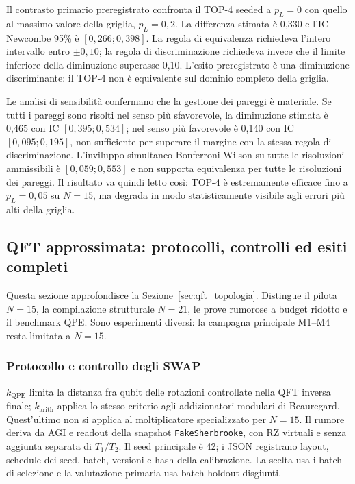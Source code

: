 \begin{onehalfspace}
\begin{table}[H]
\end{table}

Il contrasto primario preregistrato confronta il TOP-4 seeded a $p_L=0$ con quello al massimo valore della griglia, $p_L=0,2$. La differenza stimata \`e 0,330 e l'IC Newcombe 95\% \`e $[0,266;0,398]$. La regola di equivalenza richiedeva l'intero intervallo entro $\pm0,10$; la regola di discriminazione richiedeva invece che il limite inferiore della diminuzione superasse 0,10. L'esito preregistrato \`e una diminuzione discriminante: il TOP-4 non \`e equivalente sul dominio completo della griglia.

Le analisi di sensibilit\`a confermano che la gestione dei pareggi \`e materiale. Se tutti i pareggi sono risolti nel senso pi\`u sfavorevole, la diminuzione stimata \`e 0,465 con IC $[0,395;0,534]$; nel senso pi\`u favorevole \`e 0,140 con IC $[0,095;0,195]$, non sufficiente per superare il margine con la stessa regola di discriminazione. L'inviluppo simultaneo Bonferroni-Wilson su tutte le risoluzioni ammissibili \`e $[0,059;0,553]$ e non supporta equivalenza per tutte le risoluzioni dei pareggi. Il risultato va quindi letto cos\`i: TOP-4 \`e estremamente efficace fino a $p_L=0,05$ su $N=15$, ma degrada in modo statisticamente visibile agli errori pi\`u alti della griglia.

\subsection{QFT approssimata: protocolli, controlli ed esiti completi}
\label{sec:app_aqft}

Questa sezione approfondisce la Sezione~\ref{sec:qft_topologia}.
Distingue il pilota $N=15$, la compilazione strutturale $N=21$, le prove
rumorose a budget ridotto e il benchmark QPE. Sono esperimenti diversi:
la campagna principale M1--M4 resta limitata a $N=15$.

\subsubsection{Protocollo e controllo degli SWAP}

$k_{\mathrm{QPE}}$ limita la distanza fra qubit delle rotazioni
controllate nella QFT inversa finale; $k_{\mathrm{arith}}$ applica lo
stesso criterio agli addizionatori modulari di Beauregard.
Quest'ultimo non si applica al moltiplicatore specializzato per $N=15$.
Il rumore deriva da AGI e readout della snapshot \texttt{FakeSherbrooke},
con RZ virtuali e senza aggiunta separata di $T_1/T_2$. Il seed principale
è 42; i JSON registrano layout, schedule dei seed, batch, versioni e hash
della calibrazione. La scelta usa i batch di selezione e la valutazione
primaria usa batch holdout disgiunti.


\end{onehalfspace}
